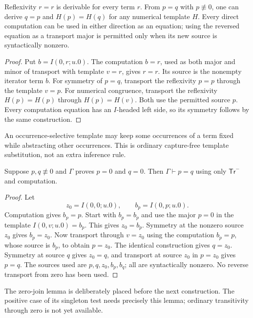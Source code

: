 \begin{lemma}
\label{zs:safe-equality}
Reflexivity $r=r$ is derivable for every term $r$. From $p=q$ with
$p\not\equiv0$, one can derive $q=p$ and $H(p)=H(q)$ for any numerical
template $H$. Every direct computation can be used in either direction
as an equation; using the reversed equation as a transport major is
permitted only when its new source is syntactically nonzero.
\end{lemma}
\begin{proof}
Put $b=I(0,r;u.0)$. The computation $b=r$, used as both major and
minor of transport with template $v=r$, gives $r=r$. Its source is
the nonempty iterator term $b$.
For symmetry of $p=q$, transport the reflexivity $p=p$ through the
template $v=p$. For numerical congruence, transport the reflexivity
$H(p)=H(p)$ through $H(p)=H(v)$. Both use the permitted source $p$.
Every computation equation has an $I$-headed left side, so its
symmetry follows by the same construction.
\end{proof}

An occurrence-selective template may keep some occurrences of a term
fixed while abstracting other occurrences. This is ordinary
capture-free template substitution, not an extra inference rule.

\begin{lemma}
\label{zs:zero-join}
Suppose $p,q\not\equiv0$ and $\Gamma$ proves $p=0$ and $q=0$.
Then $\Gamma\vdash p=q$ using only $\mathsf{Tr}^{-}$ and computation.
\end{lemma}
\begin{proof}
Let
\[
 z_0=I(0,0;u.0),\qquad b_p=I(0,p;u.0).
\]
Computation gives $b_p=p$. Start with $b_p=b_p$ and use the major
$p=0$ in the template $I(0,v;u.0)=b_p$. This gives $z_0=b_p$.
Symmetry at the nonzero source $z_0$ gives $b_p=z_0$.
Now transport through $v=z_0$ using the computation $b_p=p$, whose
source is $b_p$, to obtain $p=z_0$.
The identical construction gives $q=z_0$. Symmetry at source $q$
gives $z_0=q$, and transport at source $z_0$ in $p=z_0$ gives $p=q$.
The sources used are $p,q,z_0,b_p,b_q$; all are syntactically nonzero.
No reverse transport from zero has been used.
\end{proof}

The zero-join lemma is deliberately placed before the next construction.
The positive case of its singleton test needs precisely this lemma;
ordinary transitivity through zero is not yet available.

